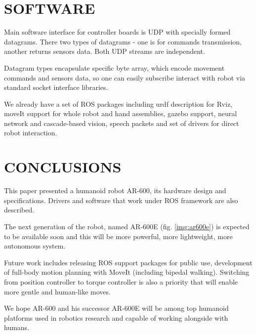 \documentclass[letterpaper, 10 pt, conference]{ieeeconf}  %
\begin{document}
\section{SOFTWARE}

Main software interface for controller boards is UDP with specially formed
datagrams. There two types of datagrams - one is for commands transmission,
another returns sensors data. Both UDP streams
are independent.

Datagram types encapsulate specific byte array, which encode movement
commands and sensors data, so one can easily subscribe interact with robot via
standard socket interface libraries.

We already have a set of ROS packages including urdf description for Rviz,
moveIt support for whole robot and hand assemblies, gazebo support, neural
network and cascade-based vision, speech packets and set of drivers for direct
robot interaction.

\section{CONCLUSIONS}

This paper presented a humanoid robot AR-600, its hardware design and
specifications. Drivers and software that work under ROS framework are
also described.

The next generation of the robot, named AR-600E (fig. \ref{img:ar600e}) is
expected to be available soon and this will be more powerful, more lightweight,
more autonomous system.

Future work includes releasing ROS support packages for public use, development
of full-body motion planning with MoveIt (including bipedal walking). Switching
from position controller to torque controller is also a priority that
will enable more gentle and human-like moves. 

We hope AR-600 and his successor AR-600E will be among top humanoid platforms
used in robotics research and capable of working alongside with humans.
\end{document}
